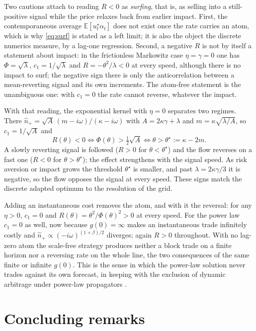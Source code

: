 \documentclass[11pt]{article}
\newcommand{\E}{\mathbb{E}}
\theoremstyle{plain}
\theoremstyle{definition}
\theoremstyle{remark}
\begin{document}
Two cautions attach to reading $R<0$ as \emph{surfing}, that is, as selling into a still-positive signal while the price relaxes back from earlier impact. First, the contemporaneous average $\E[u^\star_t\alpha_t]$ does not exist once the rate carries an atom, which is why \eqref{eq:surf} is stated as a left limit; it is also the object the discrete numerics measure, by a lag-one regression. Second, a negative $R$ is not by itself a statement about impact: in the frictionless Markowitz case $\eta=\gamma=0$ one has $\Phi=\sqrt\lambda$, $c_1=1/\sqrt\lambda$ and $R=-\theta^2/\lambda<0$ at every speed, although there is no impact to surf; the negative sign there is only the anticorrelation between a mean-reverting signal and its own increments. The atom-free statement is the unambiguous one: with $c_1=0$ the rate cannot reverse, whatever the impact.

With that reading, the exponential kernel with $\eta=0$ separates two regimes. There $\hat n_+=\sqrt A\,(m-i\omega)/(\kappa-i\omega)$ with $A=2\kappa\gamma+\lambda$ and $m=\kappa\sqrt{\lambda/A}$, so $c_1=1/\sqrt A$ and
\[
R(\theta)<0 \iff \Phi(\theta)>\tfrac12\sqrt A \iff \theta>\theta^\star:=\kappa-2m.
\]
A slowly reverting signal is followed ($R>0$ for $\theta<\theta^\star$) and the flow reverses on a fast one ($R<0$ for $\theta>\theta^\star$); the effect strengthens with the signal speed. As risk aversion or impact grows the threshold $\theta^\star$ is smaller, and past $\lambda=2\kappa\gamma/3$ it is negative, so the flow opposes the signal at every speed. These signs match the discrete adapted optimum to the resolution of the grid.

Adding an instantaneous cost removes the atom, and with it the reversal: for any $\eta>0$, $c_1=0$ and $R(\theta)=\theta^2/\Phi(\theta)^2>0$ at every speed. For the power law $c_1=0$ as well, now because $g(0)=\infty$ makes an instantaneous trade infinitely costly and $\hat n_+\propto(-i\omega)^{(1+\beta)/2}$ diverges; again $R>0$ throughout. With no lag-zero atom the scale-free strategy produces neither a block trade on a finite horizon nor a reversing rate on the whole line, the two consequences of the same finite or infinite $g(0)$. This is the sense in which the power-law solution never trades against its own forecast, in keeping with the exclusion of dynamic arbitrage under power-law propagators \citep{Gatheral2010}.

\section{Concluding remarks}\label{sec:conclusion}
\end{document}
